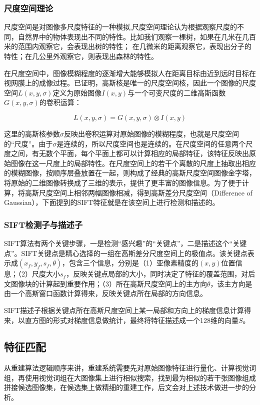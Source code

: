 \documentclass[UTF8]{csoarticle}
\begin{document}
\subsubsection{尺度空间理论}
尺度空间是对图像多尺度特征的一种模拟,尺度空间理论认为根据观察尺度的不同，自然界中的物体表现出不同的特性。比如我们观察一棵树，如果在几米在几百米的范围内观察它，会表现出树的特性； 在几微米的距离观察它，表现出分子的特性；在几公里外观察它，则表现出森林的特性。

在尺度空间中，图像模糊程度的逐渐增大能够模拟人在距离目标由近到远时目标在视网膜上的成像过程。已证明，高斯核是唯一的尺度空间核，因此一个图像的尺度空间\(L(x,y,\sigma)\)定义为原始图像\(I(x,y)\)与一个可变尺度的二维高斯函数\(G(x,y,\sigma)\)的卷积运算：

\begin{equation}
  L(x,y,\sigma) = G(x,y,\sigma) \otimes I(x,y)
\end{equation}

这里的高斯核参数\(\sigma\)反映出卷积运算对原始图像的模糊程度，也就是尺度空间的“尺度”。由于\(\sigma\)是连续的，所以尺度空间也是连续的。在尺度空间的任意两个尺度之间，有无数个平面，每个平面上都可以计算相应的局部特征，该特征反映出原始图像在这一尺度上的局部特性。在尺度空间上的若干个离散的尺度上抽取出相应的模糊图像，按顺序层叠放置在一起，则构成了经典的高斯尺度空间图像金字塔，将原始的二维图像转换成了三维的表示，提供了更丰富的图像信息。为了便于计算，将高斯尺度空间上相邻两幅图像相减，得到高斯差分尺度空间（Difference of Gaussian），下面提到的SIFT特征就是在该空间上进行检测和描述的。

\subsubsection{SIFT检测子与描述子}
SIFT算法有两个关键步骤，一是检测“感兴趣”的“关键点”，二是描述这个“关键点”。SIFT关键点是精心选择的一组在高斯差分尺度空间上的极值点。该关键点表示成\((x_f,y_f,s_f,\theta)\)，包含三个信息，分别是（1）亚像素精度的\((x,y)\)位置信息；（2）尺度大小\(s_f\)，反映关键点局部的大小，同时决定了特征的覆盖范围，对后文图像块的计算起到重要作用；（3）所在高斯尺度空间上的主方向\(\theta\)，该主方向是由一个高斯窗口函数计算得来，反映关键点所在局部的方向信息。

SIFT描述子根据关键点所在高斯尺度空间上某一局部和方向上的梯度信息计算得来，以直方图的形式对梯度信息做统计，最终将特征描述成一个128维的向量\(S\)。

\subsection{特征匹配}
从重建算法逻辑顺序来讲，重建系统需要先对原始图像特征进行量化、计算视觉词组，再使用视觉词组在大图像集上进行相似搜索，找到最为相似的若干张图像组成拼接候选图像集，在候选集上做精细的重建工作，后文会对上述技术做进一步的分析。
\end{document}
